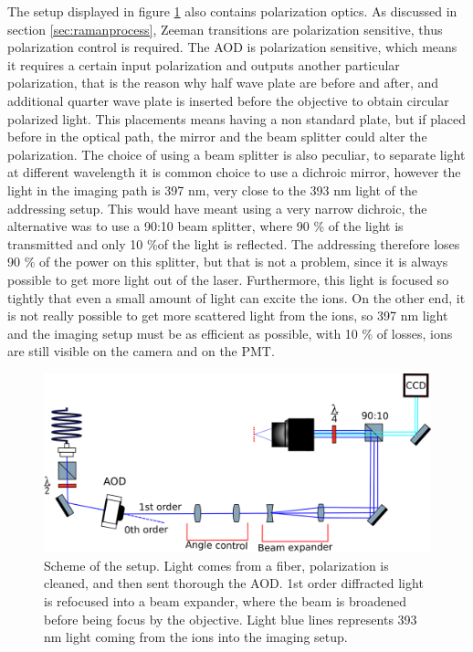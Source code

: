 The setup displayed in figure \ref{addressingsetup} also contains polarization optics. As discussed in section \ref{sec:ramanprocess}, Zeeman transitions are polarization sensitive, thus polarization control is required. The AOD is polarization sensitive, which means it requires a certain input polarization and outputs another particular polarization, that is the reason why half wave plate are before and after, and additional quarter wave plate is inserted before the objective to obtain circular polarized light. This placements means having a non standard plate, but if placed before in the optical path, the mirror and the beam splitter could alter the polarization. The choice of using a beam splitter is also peculiar, to separate light at different wavelength it is common choice to use a dichroic mirror, however the light in the imaging path is 397 nm, very close to the 393 nm light of the addressing setup. This would have meant using a very narrow dichroic, the alternative was to use a 90:10 beam splitter, where 90 \% of the light is transmitted and only 10 \%of the light is reflected. The addressing therefore loses 90 \% of the power on this splitter, but that is not a problem, since it is always possible to get more light out of the laser. Furthermore, this light is focused so tightly that even a small amount of light can excite the ions. On the other end, it is not really possible to get more scattered light from the ions, so 397 nm light and the imaging setup must be as efficient as possible, with 10 \% of losses, ions are still visible on the camera and on the PMT.

\begin{figure}
\centering
\includegraphics[width=\textwidth]{img/setup}
\caption{Scheme of the setup. Light comes from a fiber, polarization is cleaned, and then sent thorough the AOD. 1st order diffracted light is refocused into a beam expander, where the beam is broadened before being focus by the objective. Light blue lines represents 393 nm light coming from the ions into the imaging setup.}
\label{addressingsetup}
\end{figure}

